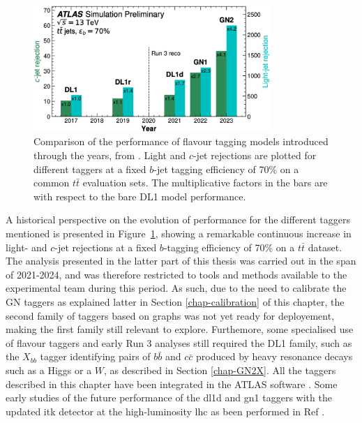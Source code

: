 \begin{figure}[h!]
  \center
  \includegraphics[width=0.8\textwidth]{Images/FTAG/storyFtag.png}
  \caption{Comparison of the performance of flavour tagging models introduced through the years, from \cite{ATL-PLOT-FTAG-2023-01}. Light and $c$-jet rejections are plotted for different taggers at a fixed $b$-jet tagging efficiency of 70\% on a common $t\bar{t}$ evaluation sets. The multiplicative factors in the bars are with respect to the bare DL1 model performance.} 
  \label{fig:storyFtag}
\end{figure}

A historical perspective on the evolution of performance for the different taggers mentioned is presented in Figure~\ref{fig:storyFtag}, showing a remarkable continuous increase in light- and $c$-jet rejections at a fixed $b$-tagging efficiency of 70\% on a $t\bar{t}$ dataset. The analysis presented in the latter part of this thesis was carried out in the span of 2021-2024, and was therefore restricted to tools and methods available to the experimental team during this period. As such, due to the need to calibrate the GN taggers as explained latter in Section \ref{chap-calibration} of this chapter, the second family of taggers based on graphs was not yet ready for deployement, making the first family still relevant to explore. Furthemore, some specialised use of flavour taggers and early Run 3 analyses still required the DL1 family, such as the $X_{bb}$ tagger identifying pairs of $b\bar{b}$ and $c\bar{c}$ produced by heavy resonance decays such as a Higgs or a $W$, as described in Section \ref{chap-GN2X}. All the taggers described in this chapter have been integrated in the ATLAS software \cite{ATL-SOFT-PUB-2021-001}. Some early studies of the future performance of the \gls{dl1d} and \gls{gn1} taggers with the updated \gls{itk} detector at the high-luminosity \gls{lhc} as been performed in Ref \cite{ATL-PHYS-PUB-2022-047}.

